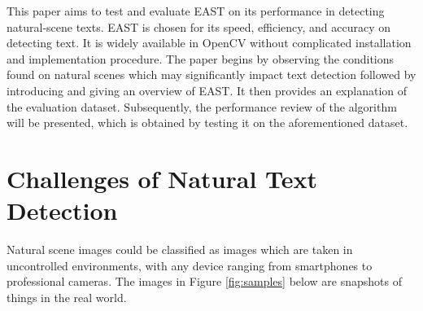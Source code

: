 \documentclass[10pt, a4paper]{article}
\begin{document}
This paper aims to test and evaluate EAST on its performance in detecting natural-scene texts. 
EAST is chosen for its speed, efficiency, and accuracy on detecting text. It is widely available in OpenCV without complicated installation and implementation procedure.
The paper begins by observing the conditions found on natural scenes which may significantly impact text detection followed by introducing and giving an overview of EAST.
It then provides an explanation of the evaluation dataset. Subsequently, the performance review of the algorithm will be presented, which is obtained by testing it on the aforementioned dataset.

\section{Challenges of Natural Text Detection} %
\label{sec:challenges}
Natural scene images could be classified as images which are taken in uncontrolled environments, with any device ranging from smartphones to professional cameras. The images in Figure \ref{fig:samples} below are snapshots of things in the real world.
\end{document}
